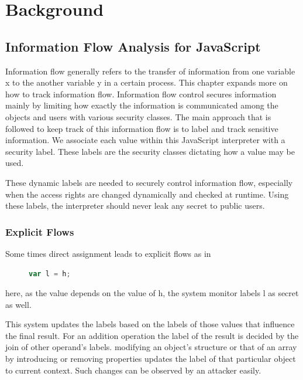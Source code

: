 \chapter{Background}


\section{Information Flow Analysis for JavaScript}

Information flow generally refers to the transfer of information from one variable x to the another variable y in a certain process. 
This chapter expands more on how to track information flow. Information flow control secures information mainly by limiting how exactly the information is communicated among the objects and users with various security classes. The main approach that is followed to keep track of this information flow is to label and track sensitive information. We associate each value within this JavaScript interpreter with a security label. These labels are the security classes dictating how a value may be used. 

These dynamic labels are needed to securely control information flow, especially when the access rights are changed dynamically and checked at runtime. Using these labels, the interpreter should never leak any secret to public users. 

\subsection{Explicit Flows}
Some times direct assignment leads to explicit flows as in 
\begin{figure}[h]
  \centering
\begin{lstlisting}[language=JavaScript, frame=none, numbers=none] 
 var l = h;
\end{lstlisting}
\end{figure}
here, as the value depends on the value of h, the system monitor labels l as secret as well.

This system updates the labels based on the labels of those values that influence the final result. For an addition operation the label of the result is decided by the join of other operand's labels. modifying an object's structure or that of an array by introducing or removing properties updates the label of that particular object to current context. Such changes can be observed by an attacker easily. 

